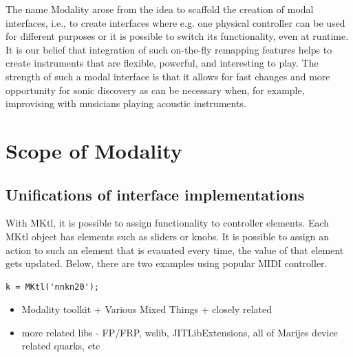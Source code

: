 \documentclass{article}
\begin{document}
The name Modality arose from the idea to scaffold the creation of modal interfaces, i.e., to create interfaces where e.g. one physical controller can be used for different purposes or it is possible to switch its functionality, even at runtime. It is our belief that integration of such on-the-fly remapping features helps to create instruments that are flexible, powerful, and interesting to play. The strength of such a modal interface is that it allows for fast changes and more opportunity for sonic discovery as can be necessary when, for example, improvising with musicians playing acoustic instruments. 



\section{Scope of Modality}
\label{sec:scope_of_modality_tech_info_where_what}


\subsection{Unifications of interface implementations}
\label{sub:unifications_of_interface_implementations}

With MKtl, it is possible to assign functionality to controller elements.
Each MKtl object has elements such as sliders or knobs. It is possible to assign an action to such an element that is evauated every time, the value of that element gets updated. Below, there are two examples using popular MIDI controller.

\begin{Verbatim}
k = MKtl('nnkn20');
\end{Verbatim}



\begin{itemize}
	\item Modality toolkit + Various Mixed Things + closely related
	\item more related libs - FP/FRP, wslib, JITLibExtensions, 
		all of Marijes device related quarks, etc 
\end{itemize}
\end{document}

